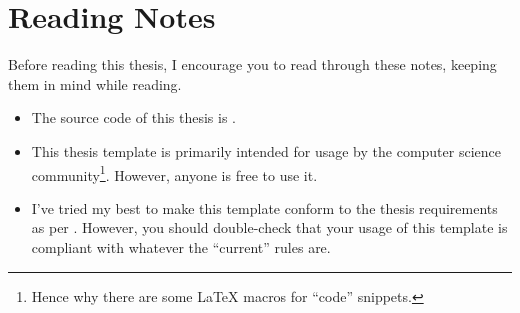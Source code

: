 \chapter{Reading Notes}
\label{chap:reading_notes}

Before reading this thesis, I encourage you to read through these notes, keeping
them in mind while reading.

\begin{itemize}

      \item The source code of this thesis is .

      \item This thesis template is primarily intended for usage by the computer
            science community\footnote{Hence why there are some \LaTeX{} macros
            for ``code'' snippets.}. However, anyone is free to use it.

      \item I've tried my best to make this template conform to the thesis
            requirements as per .
            However, you should double-check that your usage of this template is
            compliant with whatever the ``current'' rules are.

\end{itemize}


